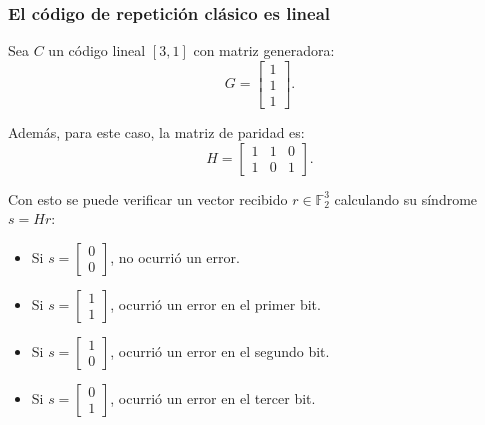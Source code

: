 \begin{frame}
  \frametitle{El código de repetición clásico es lineal}

  Sea $C$ un código lineal $[3, 1]$ con matriz generadora:
  \begin{equation}
    G = \begin{bmatrix} 1 \\ 1 \\ 1 \end{bmatrix}.
  \end{equation}

  Además, para este caso, la matriz de paridad es:
  \begin{equation}
    H = \begin{bmatrix} 1 & 1 & 0 \\ 1 & 0 & 1 \end{bmatrix}.
  \end{equation}

  Con esto se puede verificar un vector recibido $r \in \mathbb{F}_2^3$ calculando su síndrome $s = H r$:

  \begin{itemize}
    \item Si $s = \begin{bmatrix} 0 \\ 0 \end{bmatrix}$, no ocurrió un error.
    \item Si $s = \begin{bmatrix} 1 \\ 1 \end{bmatrix}$, ocurrió un error en el primer bit.
    \item Si $s = \begin{bmatrix} 1 \\ 0 \end{bmatrix}$, ocurrió un error en el segundo bit.
    \item Si $s = \begin{bmatrix} 0 \\ 1 \end{bmatrix}$, ocurrió un error en el tercer bit.
  \end{itemize}
\end{frame}
